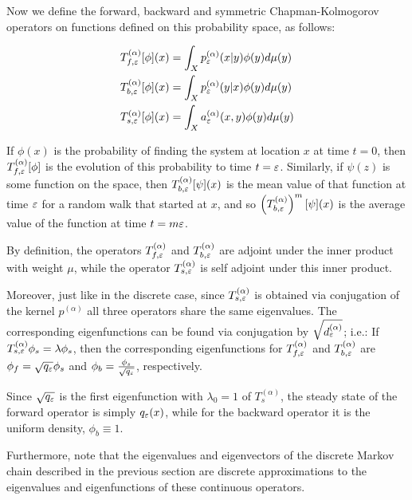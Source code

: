 Now we define the  forward, backward and symmetric Chapman-Kolmogorov operators on functions defined on this probability space, as follows:

\begin{definition}\begin{equation*}\begin{aligned}
T_{f,\varepsilon}^{(\alpha)}[\phi](x) &= \int_X p_\varepsilon^{(\alpha)}(x|y)\phi(y)d\mu(y)\\
T_{b,\varepsilon}^{(\alpha)}[\phi](x) &= \int_X p_\varepsilon^{(\alpha)}(y|x)\phi(y)d\mu(y)\\
T_{s,\varepsilon}^{(\alpha)}[\phi](x) &= \int_X a_\varepsilon^{(\alpha)}(x,y)\phi(y)d\mu(y)
\end{aligned}\end{equation*}\end{definition}

If $\phi(x)$ is the probability of finding the system at location $x$ at time $t = 0$, then $T_{f,\varepsilon}^{(\alpha)}[\phi]$ is the evolution of this probability to time $t = \varepsilon$. Similarly, if $\psi(z)$ is some function on the space, then $T_{b,\varepsilon}^{(\alpha)}[\psi](x)$ is the mean value of that function at time $\varepsilon$ for a random walk that started at $x$, and so $\left(T_{b,\varepsilon}^{(\alpha)}\right)^m[\psi](x)$ is the average value of the function at time $t = m\varepsilon$.

By definition, the operators $T_{f,\varepsilon}^{(\alpha)}$ and $T_{b,\varepsilon}^{(\alpha)}$ are adjoint under the inner product with weight $\mu$, while the operator $T_{s,\varepsilon}^{(\alpha)}$ is self adjoint under this inner product.

Moreover, just like in the discrete case, since $T_{s,\varepsilon}^{(\alpha)}$ is obtained via conjugation of the kernel $p^{(\alpha)}$ all three operators share the same eigenvalues. The corresponding eigenfunctions can be found via
conjugation by $\sqrt{d^{(\alpha)}_\varepsilon}$; i.e.:
If $T_{s,\varepsilon}^{(\alpha)}\phi_s = \lambda\phi_s$, then the corresponding eigenfunctions for $T_{f,\varepsilon}^{(\alpha)}$ and $T_{b,\varepsilon}^{(\alpha)}$ are $\phi_f =
\sqrt{q_\varepsilon}\phi_s$ and $\phi_b = \frac{\phi_s}{\sqrt{q_\varepsilon}}$, respectively.

Since $\sqrt{q_\varepsilon}$ is the first eigenfunction with $\lambda_0 = 1$ of $T_s^{(\alpha)}$, the steady state of the forward operator is simply $q_\varepsilon(x)$, while for the backward operator it is the uniform density, $\phi_b \equiv 1$.

Furthermore, note that the eigenvalues and eigenvectors of the discrete Markov chain described in the previous section are discrete approximations to the eigenvalues and eigenfunctions of these continuous operators.

